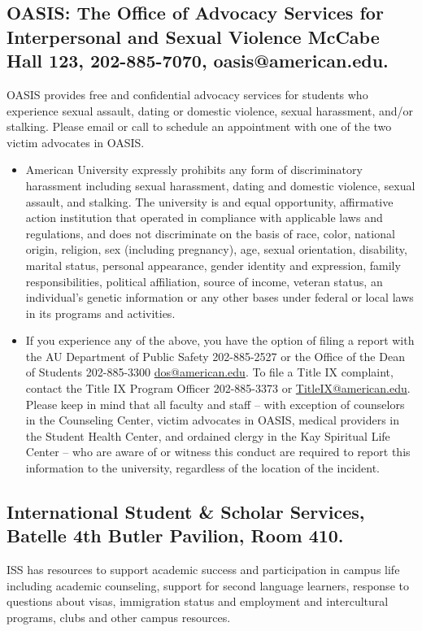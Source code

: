 \subsection{OASIS: The Office of Advocacy Services for
Interpersonal and Sexual Violence McCabe Hall 123, 202-885-7070,
oasis@american.edu.} OASIS provides free and confidential
advocacy services for students who experience sexual assault,
dating or domestic violence, sexual harassment, and/or stalking.
Please email or call to schedule an appointment with one of the
two victim advocates in OASIS.

\begin{itemize} \tightlist \item American University expressly
prohibits any form of discriminatory harassment including sexual
harassment, dating and domestic violence, sexual assault, and
stalking. The university is and equal opportunity, affirmative
action institution that operated in compliance with applicable
laws and regulations, and does not discriminate on the basis of
race, color, national origin, religion, sex (including
pregnancy), age, sexual orientation, disability, marital status,
personal appearance, gender identity and expression, family
responsibilities, political affiliation, source of income,
veteran status, an individual's genetic information or any other
bases under federal or local laws in its programs and activities.
\item If you experience any of the above, you have the option of
filing a report with the AU Department of Public Safety
202-885-2527 or the Office of the Dean of Students 202-885-3300
\href{mailto:dos@american.edu}{dos@american.edu}. To file a Title
IX complaint, contact the Title IX Program Officer 202-885-3373
or \href{mailto:TitleIX@american.edu}{TitleIX@american.edu}.
Please keep in mind that all faculty and staff -- with exception
of counselors in the Counseling Center, victim advocates in
OASIS, medical providers in the Student Health Center, and
ordained clergy in the Kay Spiritual Life Center -- who are aware
of or witness this conduct are required to report this
information to the university, regardless of the location of the
incident. \end{itemize}

\subsection{International Student \& Scholar Services, Batelle
4th Butler Pavilion, Room 410.} ISS has resources to support
academic success and participation in campus life including
academic counseling, support for second language learners,
response to questions about visas, immigration status and
employment and intercultural programs, clubs and other campus
resources.
